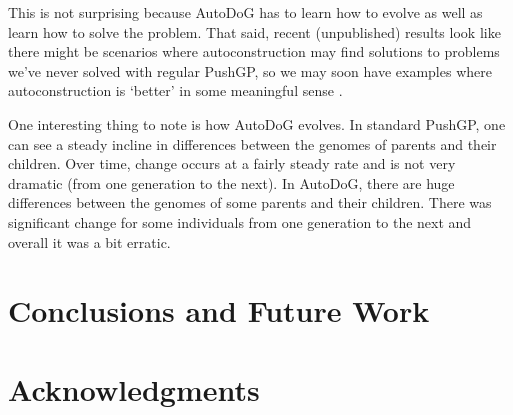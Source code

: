 \documentclass{sig-alternate}
\begin{document}
This is not surprising because AutoDoG has to learn how to evolve as well as learn how to solve the problem. That said, recent (unpublished) results look like there might be scenarios where autoconstruction may find solutions to problems we've never solved with regular PushGP, so we may soon have examples where autoconstruction is `better' in some meaningful sense \cite{Eva:autoconstruction}.


One interesting thing to note is how AutoDoG evolves. In standard PushGP, one can see a steady incline in differences between the genomes of parents and their children. Over time, change occurs at a fairly steady rate and is not very dramatic (from one generation to the next). In AutoDoG, there are huge differences between the genomes of some parents and their children. There was significant change for some individuals from one generation to the next and overall it was a bit erratic.
\section{Conclusions and Future Work}
\label{sec:conclusion}

\section{Acknowledgments}
\label{sec:acknowledgments}



  

\end{document}
